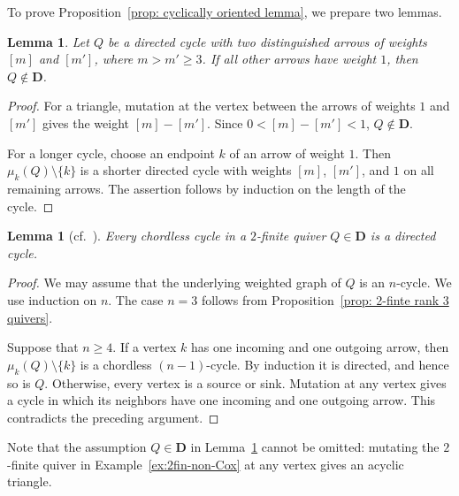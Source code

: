 \documentclass[11pt,reqno]{amsart}
\numberwithin{equation}{section}
\theoremstyle{definition}
\theoremstyle{plain}
\newtheorem{lemma}[example]{Lemma}
\newcommand{\D}{\mathbf{D}}
\newcommand{\bra}[1]{\left[#1\right]}
\begin{document}
	To prove Proposition~\ref{prop: cyclically oriented lemma}, we prepare two lemmas.
	
	\begin{lemma}\label{lem: cycle restriction from D}
		Let $Q$ be a directed cycle with two distinguished arrows of weights $\bra m$ and $\bra{m'}$, where $m>m'\geq3$. If all other arrows have weight $1$, then $Q\notin\D$.
	\end{lemma}
	
	\begin{proof}
		For a triangle, mutation at the vertex between the arrows of weights $1$ and $\bra{m'}$ gives the weight $\bra m-\bra{m'}$. Since $0<\bra m-\bra{m'}<1$, $Q\notin\D$.
		
		For a longer cycle, choose an endpoint $k$ of an arrow of weight $1$. Then $\mu_k(Q)\setminus\{k\}$ is a shorter directed cycle with weights $\bra m$, $\bra{m'}$, and $1$ on all remaining arrows. The assertion follows by induction on the length of the cycle.
	\end{proof}
	
	\begin{lemma}[cf.~{\cite[Proposition~9.7]{FZ03a}}]\label{lem: cyclic orientation of 2 finite quivers}
		Every chordless cycle in a $2$-finite quiver $Q\in\D$ is a directed cycle.
	\end{lemma}
	
	\begin{proof}
		We may assume that the underlying weighted graph of $Q$ is an $n$-cycle. We use induction on $n$. The case $n=3$ follows from Proposition~\ref{prop: 2-finte rank 3 quivers}.
		
		Suppose that $n\geq4$. If a vertex $k$ has one incoming and one outgoing arrow, then $\mu_k(Q)\setminus\{k\}$ is a chordless $(n-1)$-cycle. By induction it is directed, and hence so is $Q$. Otherwise, every vertex is a source or sink. Mutation at any vertex gives a cycle in which its neighbors have one incoming and one outgoing arrow. This contradicts the preceding argument.
	\end{proof}
	
	Note that the assumption $Q\in\D$ in Lemma~\ref{lem: cyclic orientation of 2 finite quivers} cannot be omitted: mutating the $2$-finite quiver in Example~\ref{ex:2fin-non-Cox} at any vertex gives an acyclic triangle.
	
\end{document}
